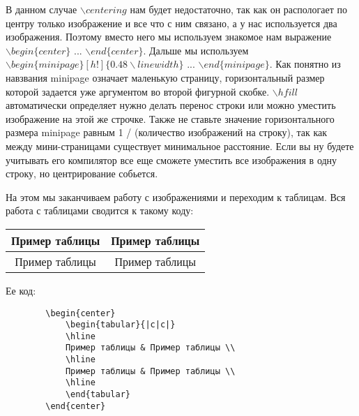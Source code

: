     В данном случае $\backslash centering$ нам будет недостаточно, так как он распологает по центру только изображение и все что с ним связано, а у нас используется два изображения. Поэтому вместо него мы используем знакомое нам выражение $\backslash begin\{center\}$ ... $\backslash end\{center\}$. Дальше мы используем $\backslash begin\{minipage\}[h!]\{0.48 \backslash linewidth\}$ ... $\backslash end\{minipage\}$. Как понятно из навзвания minipage означает маленькую страницу, горизонтальный размер которой задается уже аргументом во второй фигурной скобке. $\backslash hfill$ автоматически определяет нужно делать перенос строки или можно уместить изображение на этой же строчке. Также не ставьте значение горизонтального размера minipage равным 1 / (количество изображений на строку), так как между мини-страницами существует минимальное расстояние. Если вы ну будете учитывать его компилятор все еще сможете уместить все изображения в одну строку, но центрирование собьется.
    
    На этом мы заканчиваем работу с изображениями и переходим к таблицам. Вся работа с таблицами сводится к такому коду:
    
    \vspace{0.5cm}   
    
    \begin{center}    
        \begin{tabular}{|c|c|}
        \hline 
        Пример таблицы & Пример таблицы \\ 
        \hline 
        Пример таблицы & Пример таблицы \\ 
        \hline 
        \end{tabular}
    \end{center}
    
    \vspace{0.5cm}
    
    Ее код:    
    
    \begin{verbatim}
        \begin{center}
            \begin{tabular}{|c|c|}
            \hline 
            Пример таблицы & Пример таблицы \\ 
            \hline 
            Пример таблицы & Пример таблицы \\ 
            \hline 
            \end{tabular}
        \end{center}
    \end{verbatim}
    
